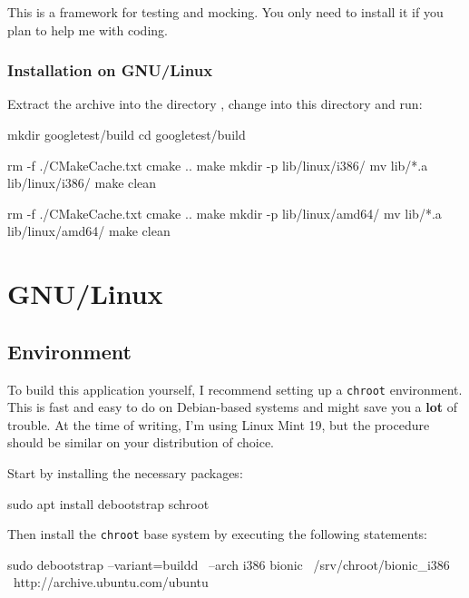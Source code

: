 This is a framework for testing and mocking.  You only need to install
it if you plan to help me with coding.

\subsubsection{Installation on GNU/Linux}

Extract the archive into the directory ,
change into this directory and run:

\begin{VerbatimBoth}
  mkdir googletest/build
  cd googletest/build
\end{VerbatimBoth}

\begin{Verbatim32}
  rm -f ./CMakeCache.txt
  cmake ..
  make
  mkdir -p lib/linux/i386/
  mv lib/*.a lib/linux/i386/
  make clean
\end{Verbatim32}

\begin{Verbatim64}
  rm -f ./CMakeCache.txt
  cmake ..
  make
  mkdir -p lib/linux/amd64/
  mv lib/*.a lib/linux/amd64/
  make clean
\end{Verbatim64}

\newpage %

\section{GNU/Linux}

\subsection{Environment}

To build this application yourself, I recommend setting up a
\texttt{chroot} environment.  This is fast and easy to do on
Debian-based systems and might save you a \textbf{lot} of trouble.  At
the time of writing, I'm using Linux Mint 19, but the procedure should
be similar on your distribution of choice.

Start by installing the necessary packages:

\begin{VerbatimBoth}
  sudo apt install debootstrap schroot
\end{VerbatimBoth}

Then install the \texttt{chroot} base system by executing the
following statements:

\begin{Verbatim32}
  sudo debootstrap --variant=buildd \
    --arch i386 bionic \
    /srv/chroot/bionic_i386 \
    http://archive.ubuntu.com/ubuntu
\end{Verbatim32}

